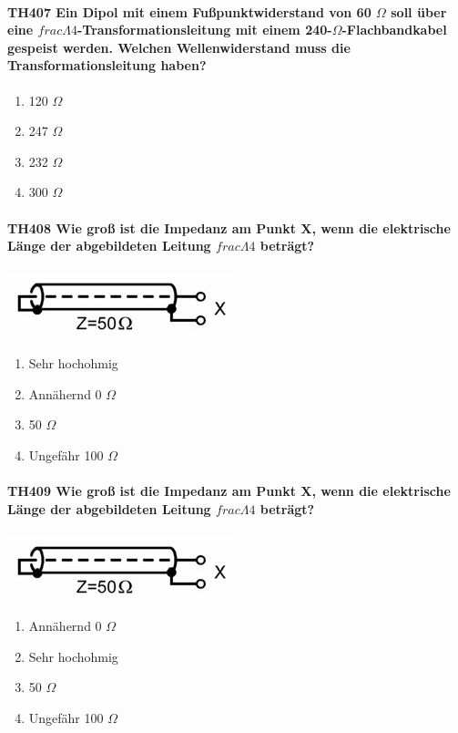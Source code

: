 \documentclass[8pt]{article}
\begin{document}
\paragraph*{TH407 Ein Dipol mit einem Fußpunktwiderstand von 60 $\Omega$ soll über eine $frac{\Lambda}{4}$-Transformationsleitung mit einem 240-$\Omega$-Flachbandkabel gespeist werden. Welchen Wellenwiderstand muss die Transformationsleitung haben?}
\begin{enumerate}[nolistsep,label=\Alph*]
\item 120 $\Omega$
\item 247 $\Omega$
\item 232 $\Omega$
\item 300 $\Omega$
\end{enumerate}

\paragraph*{TH408 Wie groß ist die Impedanz am Punkt X, wenn die elektrische Länge der abgebildeten Leitung $frac{\Lambda}{4}$ beträgt?}
\begin{center}
	\begin{minipage}{\linewidth}
		\centering
		\includegraphics[scale=1.0]{pics/th408_a.jpg}
	\end{minipage}
\end{center}
\begin{enumerate}[nolistsep,label=\Alph*]
\item Sehr hochohmig
\item Annähernd 0 $\Omega$
\item 50 $\Omega$
\item Ungefähr 100 $\Omega$
\end{enumerate}

\paragraph*{TH409 Wie groß ist die Impedanz am Punkt X, wenn die elektrische Länge der abgebildeten Leitung $frac{\Lambda}{4}$ beträgt?}
\begin{center}
	\begin{minipage}{\linewidth}
		\centering
		\includegraphics[scale=1.0]{pics/th408_a.jpg}
	\end{minipage}
\end{center}
\begin{enumerate}[nolistsep,label=\Alph*]
\item Annähernd 0 $\Omega$
\item Sehr hochohmig
\item 50 $\Omega$
\item Ungefähr 100 $\Omega$
\end{enumerate}
\end{document}
